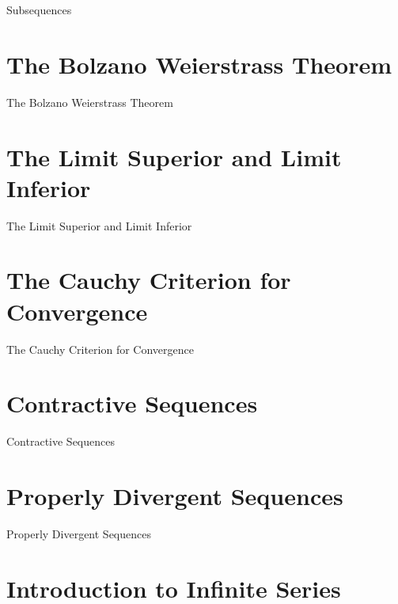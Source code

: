 Subsequences

\section{The Bolzano Weierstrass Theorem}
\label{sec:the-bolzano-weierstrass-theorem}

The Bolzano Weierstrass Theorem

\section{The Limit Superior and Limit Inferior}
\label{sec:the-limit-superior-and-limit-inferior}

The Limit Superior and Limit Inferior

\section{The Cauchy Criterion for Convergence}
\label{sec:the-cauchy-criterion-for-convergence}

The Cauchy Criterion for Convergence

\section{Contractive Sequences}
\label{sec:contractive-sequences}

Contractive Sequences

\section{Properly Divergent Sequences}
\label{sec:properly-divergent-sequences}

Properly Divergent Sequences

\section{Introduction to Infinite Series}
\label{sec:introduction-to-infinite-series}

